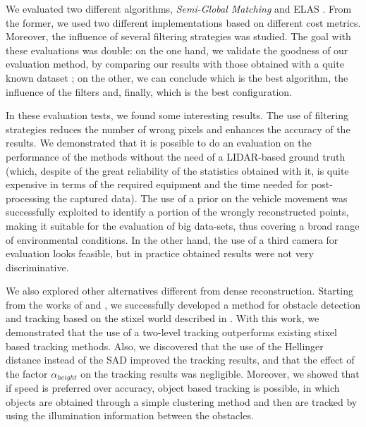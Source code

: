We evaluated two different algorithms, \emph{Semi-Global Matching} \citep{Hirschmuller2005} and \ac{ELAS} \citep{Geiger2011}. From the former, we used two different implementations based on different cost metrics. Moreover, the influence of several filtering strategies was studied. The goal with these evaluations was double: on the one hand, we validate the goodness of our evaluation method, by comparing our results with those obtained with a quite known dataset \citep{geiger2013vision}; on the other, we can conclude which is the best algorithm, the influence of the filters and, finally, which is the best configuration.

In these evaluation tests, we found some interesting results. The use of filtering strategies reduces the number of wrong pixels and enhances the accuracy of the results. We demonstrated that it is possible to do an evaluation on the performance of the methods without the need of a \ac{LIDAR}-based ground truth (which, despite of the great reliability of the statistics obtained with it, is quite expensive in terms of the required equipment and the time needed for post-processing the captured data). The use of a prior on the vehicle movement was successfully exploited to identify a portion of the wrongly reconstructed points, making it suitable for the evaluation of big data-sets, thus covering a broad range of environmental conditions. In the other hand, the use of a third camera for evaluation looks feasible, but in practice obtained results were not very discriminative.

We also explored other alternatives different from dense reconstruction. Starting from the works of \cite{benenson2011stixels} and \cite{gunyel2012stixels}, we successfully developed a method for obstacle detection and tracking based on the stixel world described in \cite{badino2009stixel}. With this work, we demonstrated that the use of a two-level tracking outperforms existing stixel based tracking methods. Also, we discovered that the use of the Hellinger distance instead of the \acl{SAD} improved the tracking results, and that the effect of the factor $\alpha_{height}$ on the tracking results was negligible. Moreover, we showed that if speed is preferred over accuracy, object based tracking is possible, in which objects are obtained through a simple clustering method and then are tracked by using the illumination information between the obstacles.


